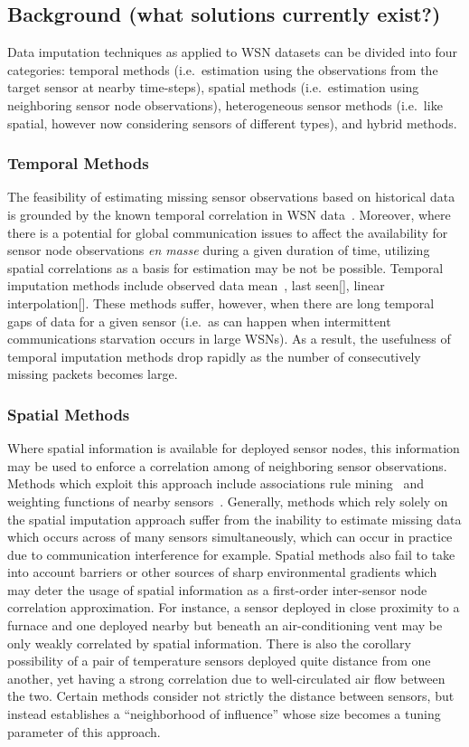 \subsection{Background (what solutions currently exist?)}
Data imputation techniques as applied to WSN datasets can be divided into four categories:
temporal methods (i.e.\ estimation using the observations from the target sensor at nearby time-steps),
spatial methods (i.e.\ estimation using neighboring sensor node observations),
heterogeneous sensor methods (i.e.\ like spatial, however now considering sensors of different types),
and hybrid methods.

\subsubsection{Temporal Methods}
The feasibility of estimating missing sensor observations based on historical data is grounded by the known temporal correlation in WSN data~\cite{akyildiz2004exploiting}.
Moreover, where there is a potential for global communication issues to affect the availability for sensor node observations \emph{en masse} during a given duration of time, utilizing spatial correlations as a basis for estimation may be not be possible.
Temporal imputation methods include observed data mean~\cite{madden2005tinydb,setz2009combining}, last seen[], linear interpolation[].
These methods suffer, however, when there are long temporal gaps of data for a given sensor (i.e.\ as can happen when intermittent communications starvation occurs in large WSNs).
As a result, the usefulness of temporal imputation methods drop rapidly as the number of consecutively missing packets becomes large.

\subsubsection{Spatial Methods}
Where spatial information is available for deployed sensor nodes, this information may be used to enforce a correlation among of neighboring sensor observations.
Methods which exploit this approach include associations rule mining~\cite{le2005estimating,jiang2007estimating} and weighting functions of nearby sensors~\cite{li2008spatial,li2008data,pan2010k}.
Generally, methods which rely solely on the spatial imputation approach suffer from the inability to estimate missing data which occurs across of many sensors simultaneously, which can occur in practice due to communication interference for example.
Spatial methods also fail to take into account barriers or other sources of sharp environmental gradients which may deter the usage of spatial information as a first-order inter-sensor node correlation approximation.
For instance, a sensor deployed in close proximity to a furnace and one deployed nearby but beneath an air-conditioning vent may be only weakly correlated by spatial information.
There is also the corollary possibility of a pair of temperature sensors deployed quite distance from one another, yet having a strong correlation due to well-circulated air flow between the two.
Certain methods consider not strictly the distance between sensors, but instead establishes a ``neighborhood of influence'' whose size becomes a tuning parameter of this approach.

